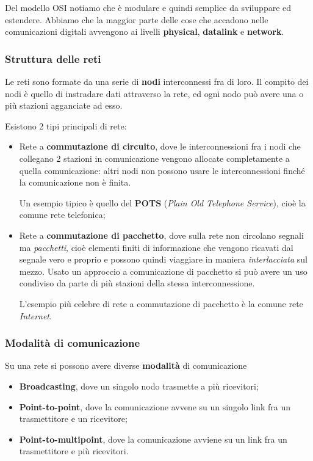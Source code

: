 \documentclass[a4paper,11pt]{article}
\begin{document}
Del modello OSI notiamo che è modulare e quindi semplice da sviluppare ed estendere.
Abbiamo che la maggior parte delle cose che accadono nelle comunicazioni digitali avvengono ai livelli \textbf{physical}, \textbf{datalink} e \textbf{network}.

\subsubsection{Struttura delle reti}
Le reti sono formate da una serie di \textbf{nodi} interconnessi fra di loro. Il compito dei nodi è quello di instradare dati attraverso la rete, ed ogni nodo può avere una o più stazioni agganciate ad esso.

Esistono 2 tipi principali di rete:
\begin{itemize}
	\item Rete a \textbf{commutazione di circuito}, dove le interconnessioni fra i nodi che collegano 2 stazioni in comunicazione vengono allocate completamente a quella comunicazione: altri nodi non possono usare le interconnessioni finché la comunicazione non è finita.

		Un esempio tipico è quello del \textbf{POTS} (\textit{Plain Old Telephone Service}), cioè la comune rete telefonica;
	\item Rete a \textbf{commutazione di pacchetto}, dove sulla rete non circolano segnali ma \textit{pacchetti}, cioè elementi finiti di informazione che vengono ricavati dal segnale vero e proprio e possono quindi viaggiare in maniera \textit{interlacciata} sul mezzo. Usato un approccio a comunicazione di pacchetto si può avere un uso condiviso da parte di più stazioni della stessa interconnessione.

		L'esempio più celebre di rete a commutazione di pacchetto è la comune rete \textit{Internet}.
\end{itemize}

\subsubsection{Modalità di comunicazione}
Su una rete si possono avere diverse \textbf{modalità} di comunicazione

\begin{itemize}
	\item \textbf{Broadcasting}, dove un singolo nodo trasmette a più ricevitori;
	\item \textbf{Point-to-point}, dove la comunicazione avvene su un singolo link fra un trasmettitore e un ricevitore;
	\item \textbf{Point-to-multipoint}, dove la comunicazione avviene su un link fra un trasmettitore e più ricevitori.
\end{itemize}
\end{document}
